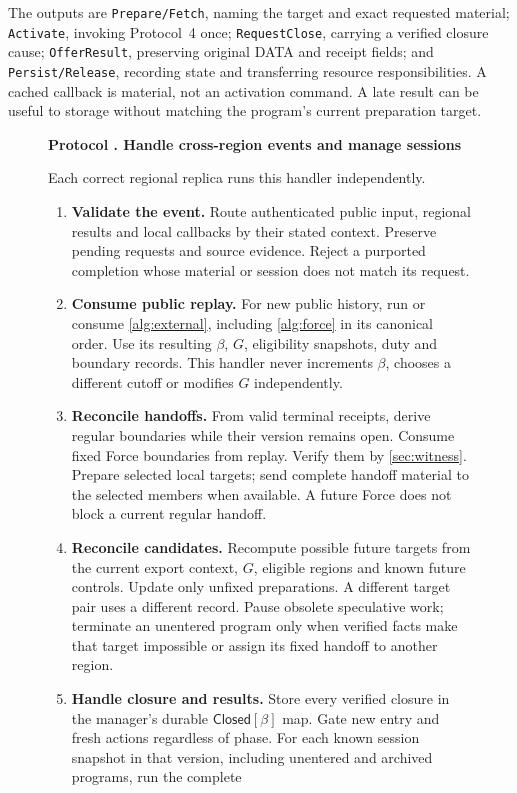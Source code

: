 \documentclass[11pt,a4paper]{article}
\newcommand{\tagg}[1]{\ensuremath{\mathsf{#1}}}
\newcounter{protocol}
\newenvironment{protocol}[3][htbp]{\begin{figure}[#1]\refstepcounter{protocol}\label{#2}
\begin{mdframed}[linewidth=.6pt,skipabove=0pt,skipbelow=0pt,
innertopmargin=7pt,innerbottommargin=7pt]\small
\textbf{Protocol \theprotocol. #3}\par\smallskip}{\end{mdframed}\end{figure}}
\begin{document}
The outputs are \texttt{Prepare/Fetch}, naming the target and exact
requested material; \texttt{Activate}, invoking Protocol~4 once;
\texttt{RequestClose}, carrying a verified closure cause;
\texttt{OfferResult}, preserving original DATA and receipt fields;
and \texttt{Persist/Release}, recording state and transferring resource
responsibilities. A cached callback is material, not an activation
command. A late result can be useful to storage without matching the
program's current preparation target.

\begin{protocol}[H]{alg:rotation}{Handle cross-region events and manage sessions}
Each correct regional replica runs this handler independently.
\begin{enumerate}[label=\textbf{\arabic*)},itemsep=3pt]
\item \textbf{Validate the event.} Route authenticated public input,
regional results and local callbacks by their stated context. Preserve
pending requests and source evidence. Reject a purported completion
whose material or session does not match its request.
\item \textbf{Consume public replay.} For new public history, run or
consume \cref{alg:external}, including \cref{alg:force} in its canonical
order. Use its resulting $\beta$, $G$, eligibility snapshots, duty and
boundary records. This handler never increments $\beta$, chooses a
different cutoff or modifies $G$ independently.
\item \textbf{Reconcile handoffs.} From valid terminal receipts,
derive regular boundaries while their version remains open. Consume
fixed Force boundaries from replay. Verify them by
\cref{sec:witness}. Prepare selected local targets; send complete
handoff material to the selected members when available. A future
Force does not block a current regular handoff.
\item \textbf{Reconcile candidates.} Recompute possible future
targets from the current export context, $G$, eligible regions and
known future controls. Update only unfixed preparations. A different
target pair uses a different record. Pause obsolete speculative work;
terminate an unentered program only when verified facts make that
target impossible or assign its fixed handoff to another region.
\item \textbf{Handle closure and results.} Store every verified closure
in the manager's durable $\tagg{Closed}[\beta]$ map. Gate new entry and
fresh actions regardless of phase. For each known session snapshot in
that version, including unentered and archived programs, run the complete

\end{enumerate}
\end{protocol}
\end{document}
